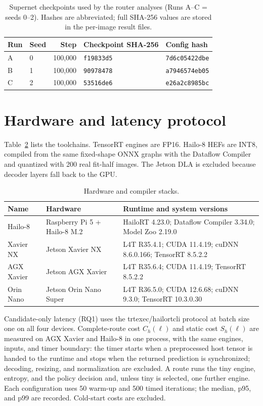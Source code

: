 \documentclass[a4paper,review,12pt]{elsarticle}
\begin{document}
\begin{table}[H]
\centering
\caption{Supernet checkpoints used by the router analyses (Runs A--C = seeds 0--2). Hashes are abbreviated; full SHA-256 values are stored in the per-image result files.}
\label{tab:provenance}
\small
\begin{tabular}{@{}llrll@{}}
\toprule
Run & Seed & Step & Checkpoint SHA-256 & Config hash \\
\midrule
A & 0 & 100,000 & \texttt{f19833d5} & \texttt{7d6c05422dbe} \\
B & 1 & 100,000 & \texttt{90978478} & \texttt{a7946574eb05} \\
C & 2 & 100,000 & \texttt{53516de6} & \texttt{e26a2c8985bc} \\
\bottomrule
\end{tabular}
\end{table}

\section{Hardware and latency protocol}

Table~\ref{tab:hardware} lists the toolchains. TensorRT engines are FP16. Hailo-8 HEFs are INT8, compiled from the same fixed-shape ONNX graphs with the Dataflow Compiler and quantized with 200 real fit-half images. The Jetson DLA is excluded because decoder layers fall back to the GPU.

\begin{table}[H]
\centering
\caption{Hardware and compiler stacks.}
\label{tab:hardware}
\small
\begin{tabularx}{\textwidth}{@{}ll>{\raggedright\arraybackslash}X@{}}
\toprule
Name & Hardware & Runtime and system versions \\
\midrule
Hailo-8 & Raspberry Pi 5 + Hailo-8 M.2 & HailoRT 4.23.0; Dataflow Compiler 3.34.0; Model Zoo 2.19.0 \\
Xavier NX & Jetson Xavier NX & L4T R35.4.1; CUDA 11.4.19; cuDNN 8.6.0.166; TensorRT 8.5.2.2 \\
AGX Xavier & Jetson AGX Xavier & L4T R35.6.4; CUDA 11.4.19; TensorRT 8.5.2.2 \\
Orin Nano & Jetson Orin Nano Super & L4T R36.5.0; CUDA 12.6.68; cuDNN 9.3.0; TensorRT 10.3.0.30 \\
\bottomrule
\end{tabularx}
\end{table}

Candidate-only latency (RQ1) uses the trtexec/hailortcli protocol at batch size one on all four devices. Complete-route cost $C_h(\ell)$ and static cost $S_h(\ell)$ are measured on AGX Xavier and Hailo-8 in one process, with the same engines, inputs, and timer boundary: the timer starts when a preprocessed host tensor is handed to the runtime and stops when the returned prediction is synchronized; decoding, resizing, and normalization are excluded. A route runs the tiny engine, entropy, and the policy decision and, unless tiny is selected, one further engine. Each configuration uses 50 warm-up and 500 timed iterations; the median, p95, and p99 are recorded. Cold-start costs are excluded.
\end{document}
